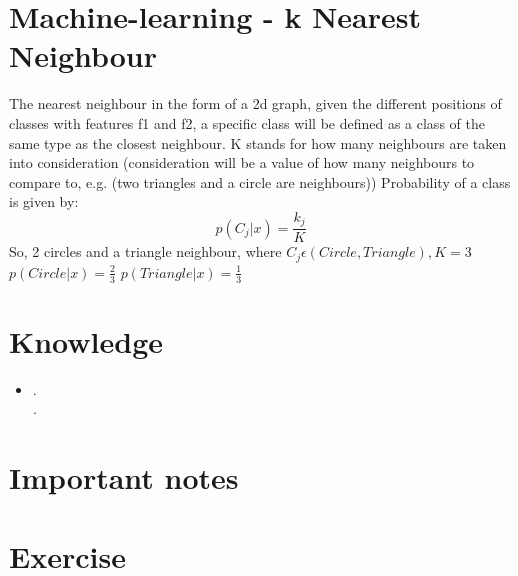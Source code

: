 \documentclass{article}
\begin{document}
\section{Machine-learning - k Nearest Neighbour}
The nearest neighbour in the form of a 2d graph, given the different positions of classes with features f1 and f2, a specific class will be defined as a class of the same type as the closest neighbour. K stands for how many neighbours are taken into consideration (consideration will be a value of how many neighbours to compare to, e.g. (two triangles and a circle are neighbours))
Probability of a class is given by: $$ p(C_j|x) = \frac{k_j}{K} $$
So, 2 circles and a triangle neighbour, where $ C_j \epsilon (Circle, Triangle), K=3$\\
$p(Circle|x) = \frac{2}{3}$
$p(Triangle|x) = \frac{1}{3}$

\section{Knowledge}
\begin{itemize}
  \item .\\
    \textit{.}
\end{itemize}

\section{Important notes}
\section{Exercise}
\end{document}
